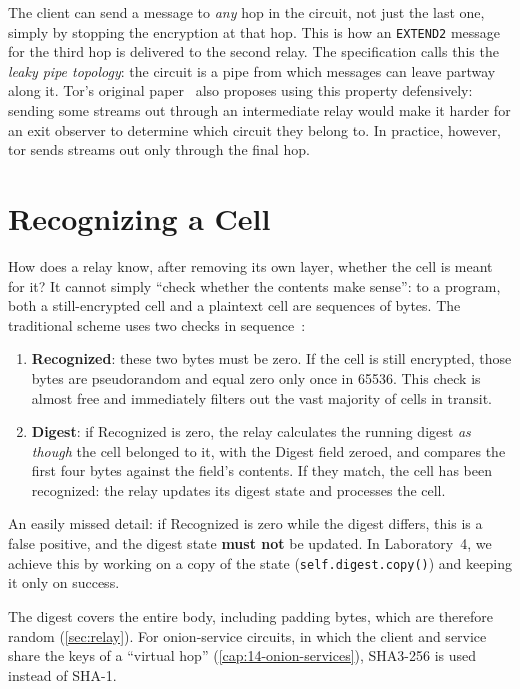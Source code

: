 The client can send a message to \emph{any} hop in the circuit, not just the last one, simply by stopping the encryption at that hop. This is how an \texttt{EXTEND2} message for the third hop is delivered to the second relay. The specification calls this the \emph{leaky pipe topology}: the circuit is a pipe from which messages can leave partway along it. Tor's original paper~\cite{dingledine2004tor} also proposes using this property defensively: sending some streams out through an intermediate relay would make it harder for an exit observer to determine which circuit they belong to. In practice, however, tor sends streams out only through the final hop.

\section{Recognizing a Cell}\label{sec:riconoscere}

How does a relay know, after removing its own layer, whether the cell is meant for it? It cannot simply \enquote{check whether the contents make sense}: to a program, both a still-encrypted cell and a plaintext cell are sequences of bytes. The traditional scheme uses two checks in sequence~:

\begin{enumerate}
  \item \textbf{Recognized}: these two bytes must be zero. If the cell is still encrypted, those bytes are pseudorandom and equal zero only once in \num{65536}. This check is almost free and immediately filters out the vast majority of cells in transit.
  \item \textbf{Digest}: if Recognized is zero, the relay calculates the running digest \emph{as though} the cell belonged to it, with the Digest field zeroed, and compares the first four bytes against the field's contents. If they match, the cell has been recognized: the relay updates its digest state and processes the cell.
\end{enumerate}

An easily missed detail: if Recognized is zero while the digest differs, this is a false positive, and the digest state \textbf{must not} be updated. In Laboratory~4, we achieve this by working on a copy of the state (\texttt{self.digest.copy()}) and keeping it only on success.

The digest covers the entire body, including padding bytes, which are therefore random (\cref{sec:relay}). For onion-service circuits, in which the client and service share the keys of a \enquote{virtual hop} (\cref{cap:14-onion-services}), SHA3-256 is used instead of SHA-1.

